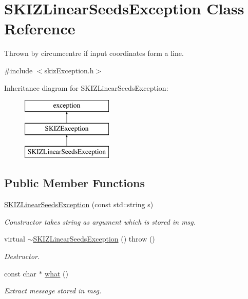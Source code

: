 \hypertarget{classSKIZLinearSeedsException}{}\section{S\+K\+I\+Z\+Linear\+Seeds\+Exception Class Reference}
\label{classSKIZLinearSeedsException}


Thrown by circumcentre if input coordinates form a line.  




{\ttfamily \#include $<$skiz\+Exception.\+h$>$}

Inheritance diagram for S\+K\+I\+Z\+Linear\+Seeds\+Exception\+:\begin{figure}[H]
\begin{center}
\leavevmode
\includegraphics[height=3.000000cm]{classSKIZLinearSeedsException}
\end{center}
\end{figure}
\subsection*{Public Member Functions}
\begin{DoxyCompactItemize}
\item 
\mbox{\hyperlink{classSKIZLinearSeedsException_a11607556ca04d52a2d2c35c06fad3f6b}{S\+K\+I\+Z\+Linear\+Seeds\+Exception}} (const std\+::string s)
\begin{DoxyCompactList}\small\item\em Constructor takes string as argument which is stored in msg. \end{DoxyCompactList}\item 
virtual \mbox{\hyperlink{classSKIZLinearSeedsException_a8482d8d51517e183205757fd4855107b}{$\sim$\+S\+K\+I\+Z\+Linear\+Seeds\+Exception}} ()  throw ()
\begin{DoxyCompactList}\small\item\em Destructor. \end{DoxyCompactList}\item 
const char $\ast$ \mbox{\hyperlink{classSKIZLinearSeedsException_a4d187b93ce4261b7303ab75e23e06e30}{what}} ()
\begin{DoxyCompactList}\small\item\em Extract message stored in msg. \end{DoxyCompactList}\end{DoxyCompactItemize}


